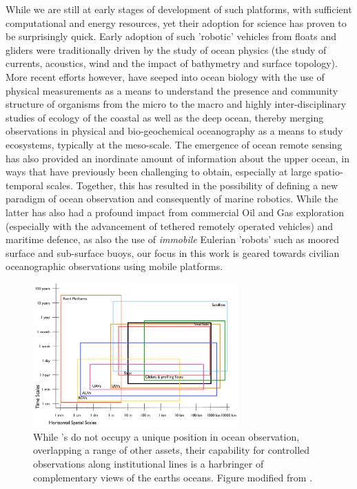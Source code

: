 While we are still at early stages of development of such platforms,
with sufficient computational and energy resources, yet their adoption
for science has proven to be surprisingly quick. Early adoption of
such 'robotic' vehicles from floats and gliders were traditionally
driven by the study of ocean physics (the study of currents,
acoustics, wind and the impact of bathymetry and surface
topology). More recent efforts however, have seeped into ocean biology
with the use of physical measurements as a means to understand the
presence and community structure of organisms from the micro to the
macro and highly inter-disciplinary studies of ecology of the coastal
as well as the deep ocean, thereby merging observations in physical
and bio-geochemical oceanography as a means to study ecosystems,
typically at the meso-scale. The emergence of ocean remote sensing has
also provided an inordinate amount of information about the upper
ocean, in ways that have previously been challenging to obtain,
especially at large spatio-temporal scales. Together, this has
resulted in the possibility of defining a new paradigm of ocean
observation and consequently of marine robotics. While the latter has
also had a profound impact from commercial Oil and Gas exploration
(especially with the advancement of tethered remotely operated
vehicles) and maritime defence, as also the use of \emph{immobile}
Eulerian 'robots' such as moored surface and sub-surface buoys, our
focus in this work is geared towards civilian oceanographic
observations using mobile platforms.


\begin{figure}[!t]
  \centering
  \includegraphics[width=0.7\textwidth]{fig/platform-capabilities.pdf}
  \caption{While \smle's do not occupy a unique position in ocean
    observation, overlapping a range of other assets, their capability
    for controlled observations along institutional lines is a
    harbringer of complementary views of the earths oceans. Figure
    modified from \cite{haury78}.}
  \label{fig:platforms}
\end{figure}

